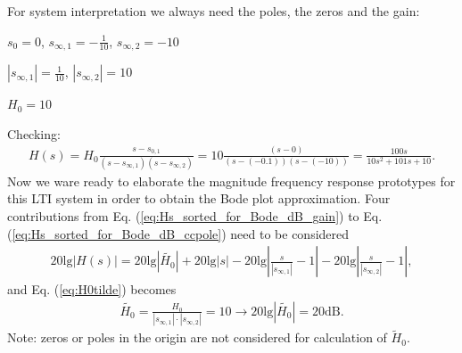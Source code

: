 \documentclass[11pt,a4paper,DIV=12]{scrartcl}
\numberwithin{equation}{section}
\numberwithin{figure}{section}
\newcommand{\eq}[1]{Eq. (\ref{#1})} %
\begin{document}
\begin{ExCalc}
For system interpretation we always need the poles, the zeros and the gain:

$s_0=0$,
$s_{\infty,1}=-\frac{1}{10}$,
$s_{\infty,2}=-10$

$|s_{\infty,1}|=\frac{1}{10}$,
$|s_{\infty,2}|=10$

$H_0=10$

\begin{center}
\end{center}

Checking:
\begin{align}
H(s) = H_0\frac{s-s_{0,1}}{(s-s_{\infty,1})(s-s_{\infty,2})} = 10\frac{(s-0)}{(s-(-0.1))(s-(-10))}
=\frac{100 s}{10 s^2 + 101 s + 10}.
\end{align}
%
Now we ware ready to elaborate the magnitude frequency response prototypes for this
LTI system in order to obtain the Bode plot approximation.
%
Four contributions from \eq{eq:Hs_sorted_for_Bode_dB_gain} to \eq{eq:Hs_sorted_for_Bode_dB_ccpole} need to be considered
\begin{align}
20\mathrm{lg}|H(s)| = 20\mathrm{lg}|\tilde{H_0}| + 20\mathrm{lg}|s| - 20\mathrm{lg}|\frac{s}{|s_{\infty,1}|}-1|
- 20\mathrm{lg}|\frac{s}{|s_{\infty,2}|}-1|,
\end{align}
and \eq{eq:H0tilde} becomes
\begin{align}
\tilde{H_0} = \frac{H_0}{|s_{\infty,1}| \cdot |s_{\infty,2}|} = 10 \rightarrow 20\mathrm{lg}|\tilde{H_0}| = 20 \mathrm{dB}.
\end{align}
Note: zeros or poles in the origin are not considered for calculation of $\tilde{H}_0$.
\end{ExCalc}
\end{document}
